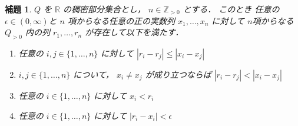 \documentclass[leqno, 12pt]{jsarticle}
\newtheorem{lem}[thm]{補題}
\newcommand{\zz}{\mathbb{Z}}
\newcommand{\rr}{\mathbb{R}}
\begin{document}
\begin{lem}\label{lem:katetov:kinjidaiji}
$Q$
を
$\rr$
の稠密部分集合とし，
$n\in \zz_{>0}$
とする．
このとき
任意の
$\epsilon\in (0, \infty)$と
$n$
項からなる任意の正の実数列
$x_{1}, \dots, x_{n}$
に対して
$n$項からなる
$Q_{>0}$
内の列
$r_{1}, \dots, r_{n}$
が存在して以下を満たす．
\begin{enumerate}
\item 
任意の
$i, j\in \{1, \dots, n\}$
に対して
$|r_{i}-r_{j}|\le |x_{i}-x_{j}|$
\item 
$i, j\in \{1, \dots, n\}$
について，
$x_{i}\neq x_{j}$
が成り立つならば
$|r_{i}-r_{j}|<|x_{i}-x_{j}|$
\item 
任意の
$i\in \{1, \dots, n\}$
に対して
$x_{i}<r_{i}$
\item 
任意の
$i\in \{1, \dots, n\}$
に対して
$|r_{i}-x_{i}|<\epsilon$
\end{enumerate}

\end{lem}
\end{document}
